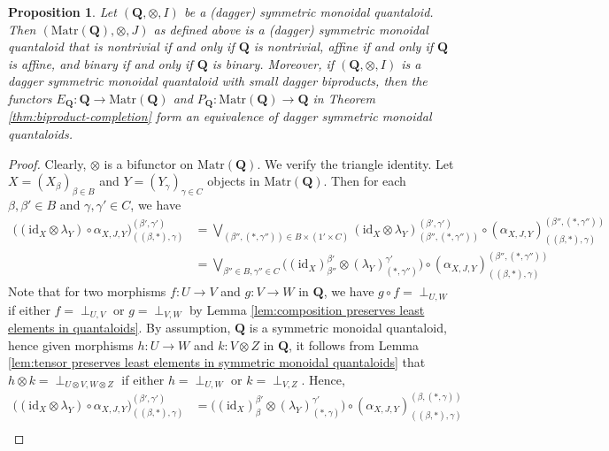 \documentclass[12pt]{tac}
\newtheorem{proposition}[theorem]{Proposition}
\theoremstyle{definition}
\theoremstyle{remark}
\newcommand{\<}{\langle}
\renewcommand{\>}{\rangle}
\renewcommand{\:}{\colon}
\newcommand{\id}{\mathrm{id}}
\begin{document}
 
 \begin{proposition}\label{prop:biproduct completion monoidal quantaloid}
     Let $(\mathbf Q,\otimes,I)$ be a (dagger) symmetric monoidal quantaloid. Then $(\mathrm{Matr}(\mathbf Q),\otimes,J)$ as defined above is a (dagger) symmetric monoidal quantaloid that is nontrivial if and only if $\mathbf Q$ is nontrivial, affine if and only if $\mathbf Q$ is affine, and binary if and only if $\mathbf Q$ is binary. Moreover, if $(\mathbf Q,\otimes, I)$ is a dagger symmetric monoidal quantaloid with small dagger biproducts, then the functors $E_\mathbf Q:\mathbf Q\to\mathrm{Matr}(\mathbf Q)$ and $P_\mathbf Q:\mathrm{Matr}(\mathbf Q)\to\mathbf Q$ in Theorem \ref{thm:biproduct-completion} form an equivalence of dagger symmetric monoidal quantaloids.
 \end{proposition}
\begin{proof}
Clearly, $\otimes$ is a bifunctor on $\mathrm{Matr}(\mathbf Q)$. We verify the triangle identity. Let $X=(X_\beta)_{\beta\in B}$ and $Y=(Y_\gamma)_{\gamma\in C}$ objects in $\mathrm{Matr}(\mathbf Q)$. Then for each $\beta,\beta'\in B$ and $\gamma,\gamma'\in C$, we have
\begin{align*}
    \big((\id_X\otimes\lambda_Y)\circ\alpha_{X,J,Y}\big)_{((\beta,*),\gamma)}^{(\beta',\gamma')} & = \bigvee_{(\beta'',(*,\gamma''))\in B\times(1'\times C)}(\id_X\otimes\lambda_Y)_{(\beta'',(*,\gamma''))}^{(\beta',\gamma')}\circ (\alpha_{X,J,Y})_{((\beta,*),\gamma)}^{(\beta'',(*,\gamma''))}\\
    & = \bigvee_{\beta''\in B, \gamma''\in C}\big((\id_X)_{\beta''}^{\beta'}\otimes(\lambda_Y)_{(*,\gamma'')}^{\gamma'}\big)\circ (\alpha_{X,J,Y})_{((\beta,*),\gamma)}^{(\beta'',(*,\gamma''))}
\end{align*}
Note that for two morphisms $f:U\to V$  and $g:V\to W$ in $\mathbf Q$, we have $g\circ f=\perp_{U,W}$ if either $f=\perp_{U,V}$ or $g=\perp_{V,W}$ by Lemma \ref{lem:composition preserves least elements in quantaloids}. By assumption, $\mathbf Q$ is a symmetric monoidal quantaloid, hence given morphisms $h:U\to W$ and $k:V\otimes Z$ in $\mathbf Q$, it follows from Lemma \ref{lem:tensor preserves least elements in symmetric monoidal quantaloids} that  $h\otimes k=\perp_{U\otimes V,W\otimes Z}$ if either $h=\perp_{U,W}$ or $k=\perp_{V,Z}$. Hence,
\begin{align*}
    \big((\id_X\otimes\lambda_Y)\circ\alpha_{X,J,Y}\big)_{((\beta,*),\gamma)}^{(\beta',\gamma')} 
    & = \big((\id_X)_{\beta}^{\beta'}\otimes(\lambda_Y)_{(*,\gamma)}^{\gamma'}\big)\circ (\alpha_{X,J,Y})_{((\beta,*),\gamma)}^{(\beta,(*,\gamma))}\\

\end{align*}
\end{proof}
\end{document}

